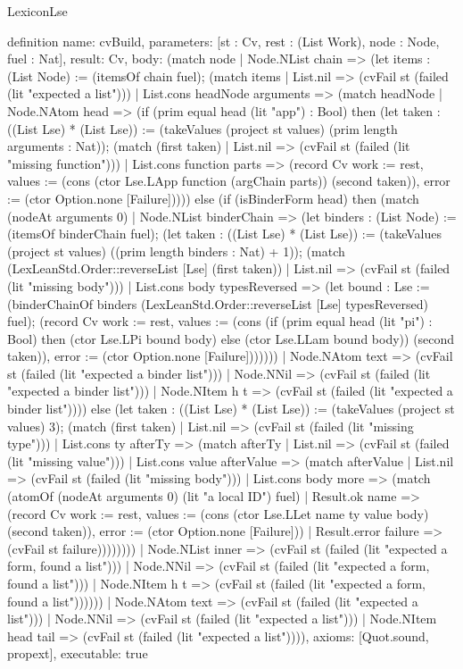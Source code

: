 \begin{lexlean}{LexiconLse}
\begin{semanticmodule}
definition{
  name: cvBuild,
  parameters: [st : Cv, rest : (List Work), node : Node, fuel : Nat],
  result: Cv,
  body: (match node
    | Node.NList chain => (let items : (List Node) := (itemsOf chain fuel); (match items
      | List.nil => (cvFail st (failed (lit "expected a list")))
      | List.cons headNode arguments => (match headNode
        | Node.NAtom head => (if (prim equal head (lit "app") : Bool) then (let taken : ((List Lse) * (List Lse)) := (takeValues (project st values) (prim length arguments : Nat)); (match (first taken)
          | List.nil => (cvFail st (failed (lit "missing function")))
          | List.cons function parts => (record Cv {work := rest, values := (cons (ctor Lse.LApp function (argChain parts)) (second taken)), error := (ctor Option.none [Failure])}))) else (if (isBinderForm head) then (match (nodeAt arguments 0)
          | Node.NList binderChain => (let binders : (List Node) := (itemsOf binderChain fuel); (let taken : ((List Lse) * (List Lse)) := (takeValues (project st values) ((prim length binders : Nat) + 1)); (match (LexLeanStd.Order::reverseList [Lse] (first taken))
            | List.nil => (cvFail st (failed (lit "missing body")))
            | List.cons body typesReversed => (let bound : Lse := (binderChainOf binders (LexLeanStd.Order::reverseList [Lse] typesReversed) fuel); (record Cv {work := rest, values := (cons (if (prim equal head (lit "pi") : Bool) then (ctor Lse.LPi bound body) else (ctor Lse.LLam bound body)) (second taken)), error := (ctor Option.none [Failure])})))))
          | Node.NAtom text => (cvFail st (failed (lit "expected a binder list")))
          | Node.NNil => (cvFail st (failed (lit "expected a binder list")))
          | Node.NItem h t => (cvFail st (failed (lit "expected a binder list")))) else (let taken : ((List Lse) * (List Lse)) := (takeValues (project st values) 3); (match (first taken)
          | List.nil => (cvFail st (failed (lit "missing type")))
          | List.cons ty afterTy => (match afterTy
            | List.nil => (cvFail st (failed (lit "missing value")))
            | List.cons value afterValue => (match afterValue
              | List.nil => (cvFail st (failed (lit "missing body")))
              | List.cons body more => (match (atomOf (nodeAt arguments 0) (lit "a local ID") fuel)
                | Result.ok name => (record Cv {work := rest, values := (cons (ctor Lse.LLet name ty value body) (second taken)), error := (ctor Option.none [Failure])})
                | Result.error failure => (cvFail st failure))))))))
        | Node.NList inner => (cvFail st (failed (lit "expected a form, found a list")))
        | Node.NNil => (cvFail st (failed (lit "expected a form, found a list")))
        | Node.NItem h t => (cvFail st (failed (lit "expected a form, found a list"))))))
    | Node.NAtom text => (cvFail st (failed (lit "expected a list")))
    | Node.NNil => (cvFail st (failed (lit "expected a list")))
    | Node.NItem head tail => (cvFail st (failed (lit "expected a list")))),
  axioms: [Quot.sound, propext],
  executable: true
}


\end{semanticmodule}
\end{lexlean}
